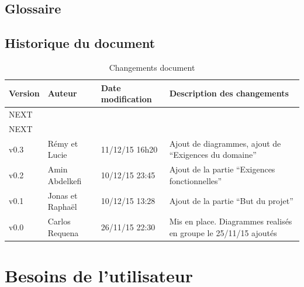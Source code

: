 \documentclass[11pt,a4paper]{article}
\begin{document}
\subsection{Glossaire}
\label{sec:glo}

\glsaddall
\printnoidxglossaries

\subsection{Historique du document}
\label{sec:hist}


\begin{table}[h]
  \centering
  \begin{tabular}[ht]{|l|l|l|p{18em}|}
    \hline

    \textbf{Version}
    & \textbf{Auteur}
    & \textbf{Date modification}
    & \textbf{Description des changements}\\ \hline \hline
    NEXT &  &  &  \\ \hline
    NEXT &  &  &  \\ \hline
    v0.3 & Rémy et Lucie  & 11/12/15 16h20 & Ajout de diagrammes, ajout de ``Exigences du domaine'' \\ \hline
    v0.2 & Amin Abdelkefi & 10/12/15 23:45 & Ajout de la partie ``Exigences fonctionnelles''\\ \hline
    v0.1 & Jonas et Raphaël & 10/12/15 13:28 & Ajout de la partie ``But du projet''\\ \hline
    v0.0 & Carlos Requena & 26/11/15 22:30 & Mis en place. Diagrammes realisés en groupe le 25/11/15 ajoutés\\ \hline
  \end{tabular}
  \caption{Changements document}
  \label{tab:hist}
\end{table}

\section{Besoins de l'utilisateur}
\label{sec:besoins}
\end{document}
